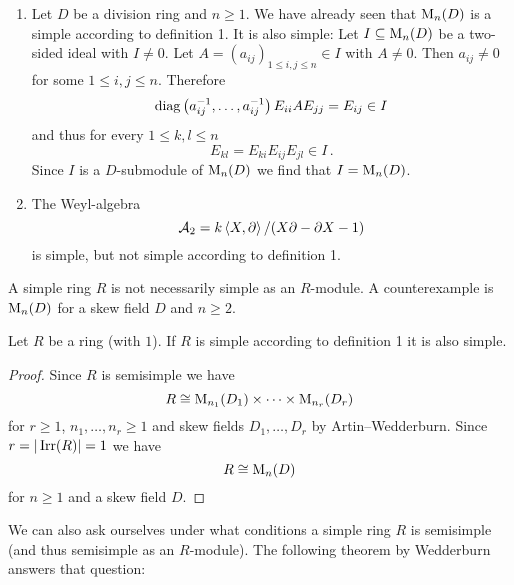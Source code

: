 \begin{example}
  \begin{enumerate}[label=\emph{\alph*)},leftmargin=*]
    \item
      Let $D$ be a division ring and $n \geq 1$.
      We have already seen that $\operatorname{M}_n(D)$ is a simple according to definition 1.
      It is also simple:
      Let $I \subseteq \operatorname{M}_n(D)$ be a two-sided ideal with $I \neq 0$.
      Let $A = (a_{ij})_{1 \leq i,j \leq n} \in I$ with $A \neq 0$.
      Then $a_{ij} \neq 0$ for some $1 \leq i,j \leq n$.
      Therefore
      \[
          \operatorname{diag}\left( a_{ij}^{-1}, \dotsc, a_{ij}^{-1} \right) E_{ii} A E_{jj}
        = E_{ij} \in I
      \]
      and thus for every $1 \leq k,l \leq n$
      \[
            E_{kl}
        =   E_{ki} E_{ij} E_{jl}
        \in I \,.
      \]
      Since $I$ is a $D$-submodule of $\operatorname{M}_n(D)$ we find that $I = \operatorname{M}_n(D)$.
    \item
      The Weyl-algebra
      \[
          \mathcal{A}_2
        = k \left\langle X,\partial \right\rangle / (X \partial - \partial X - 1)
      \]
      is simple, but not simple according to definition 1.
  \end{enumerate}
\end{example}


\begin{warning}
  A simple ring $R$ is not necessarily simple as an $R$-module.
  A counterexample is $\operatorname{M}_n(D)$ for a skew field $D$ and $n \geq 2$.
\end{warning}


\begin{lemma}
  Let $R$ be a ring (with $1$).
  If $R$ is simple according to definition 1 it is also simple.
\end{lemma}
\begin{proof}
  Since $R$ is semisimple we have
  \[
    R \cong \operatorname{M}_{n_1}(D_1) \times \dotsb \times \operatorname{M}_{n_r}(D_r)
  \]
  for $r \geq 1$, $n_1, \dotsc, n_r \geq 1$ and skew fields $D_1, \dotsc, D_r$ by Artin--Wedderburn.
  Since $r = |\operatorname{Irr}(R)| = 1$ we have
  \[
    R \cong \operatorname{M}_n(D)
  \]
  for $n \geq 1$ and a skew field $D$.
\end{proof}


We can also ask ourselves under what conditions a simple ring $R$ is semisimple (and thus semisimple as an $R$-module). The following theorem by Wedderburn answers that question:


